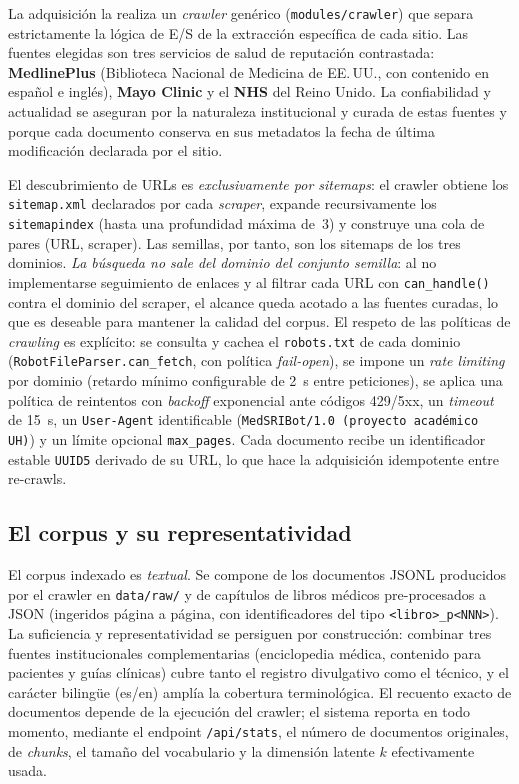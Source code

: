 \documentclass[runningheads,a4paper,14pts]{llncs}
\begin{document}
	La adquisición la realiza un \emph{crawler} genérico
	(\texttt{modules/crawler}) que separa estrictamente la lógica de E/S de la
	extracción específica de cada sitio. Las fuentes elegidas son tres servicios de
	salud de reputación contrastada: \textbf{MedlinePlus} (Biblioteca Nacional de
	Medicina de EE.\,UU., con contenido en español e inglés), \textbf{Mayo Clinic} y
	el \textbf{NHS} del Reino Unido. La confiabilidad y actualidad se aseguran por la
	naturaleza institucional y curada de estas fuentes y porque cada documento
	conserva en sus metadatos la fecha de última modificación declarada por el sitio.
	
	El descubrimiento de URLs es \emph{exclusivamente por sitemaps}: el crawler
	obtiene los \texttt{sitemap.xml} declarados por cada \emph{scraper}, expande
	recursivamente los \texttt{sitemapindex} (hasta una profundidad máxima de~3) y
	construye una cola de pares (URL, scraper). Las semillas, por tanto, son los
	sitemaps de los tres dominios. \emph{La búsqueda no sale del dominio del conjunto
		semilla}: al no implementarse seguimiento de enlaces y al filtrar cada URL con
	\texttt{can\_handle()} contra el dominio del scraper, el alcance queda acotado a
	las fuentes curadas, lo que es deseable para mantener la calidad del corpus. El
	respeto de las políticas de \emph{crawling} es explícito: se consulta y cachea el
	\texttt{robots.txt} de cada dominio (\texttt{RobotFileParser.can\_fetch}, con
	política \emph{fail-open}), se impone un \emph{rate limiting} por dominio
	(retardo mínimo configurable de 2~s entre peticiones), se aplica una política de
	reintentos con \emph{backoff} exponencial ante códigos 429/5xx, un \emph{timeout}
	de 15~s, un \texttt{User-Agent} identificable (\texttt{MedSRIBot/1.0 (proyecto
		académico UH)}) y un límite opcional \texttt{max\_pages}. Cada documento recibe un
	identificador estable \texttt{UUID5} derivado de su URL, lo que hace la
	adquisición idempotente entre re-crawls.
	
	\subsection{El corpus y su representatividad}
	
	El corpus indexado es \emph{textual}. Se compone de los documentos JSONL
	producidos por el crawler en \texttt{data/raw/} y de capítulos de libros médicos
	pre-procesados a JSON (ingeridos página a página, con identificadores del tipo
	\texttt{<libro>\_p<NNN>}). La suficiencia y representatividad se persiguen por construcción: combinar tres
	fuentes institucionales complementarias (enciclopedia médica, contenido para
	pacientes y guías clínicas) cubre tanto el registro divulgativo como el técnico,
	y el carácter bilingüe (es/en) amplía la cobertura terminológica. El recuento
	exacto de documentos depende de la ejecución del crawler; el sistema reporta en
	todo momento, mediante el endpoint \texttt{/api/stats}, el número de documentos
	originales, de \emph{chunks}, el tamaño del vocabulario y la dimensión latente
	$k$ efectivamente usada.
	
\end{document}

